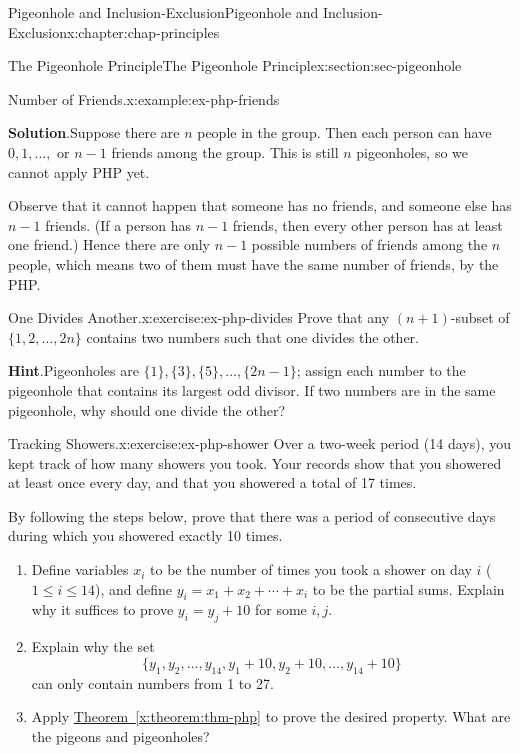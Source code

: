 \documentclass[oneside,10pt,]{book}
\newcommand{\blocktitlefont}{\relax}
\newcommand{\xreffont}{\relax}
\numberwithin{equation}{section}
\begin{document}
\begin{chapterptx}{Pigeonhole and Inclusion-Exclusion}{}{Pigeonhole and Inclusion-Exclusion}{}{}{x:chapter:chap-principles}
\begin{sectionptx}{The Pigeonhole Principle}{}{The Pigeonhole Principle}{}{}{x:section:sec-pigeonhole}
\begin{example}{Number of Friends.}{x:example:ex-php-friends}
\par\smallskip%
\noindent\textbf{\blocktitlefont Solution}.\hypertarget{g:solution:id437586}{}\quad{}Suppose there are \(n\) people in the group. Then each person can have \(0, 1, \ldots, \text{ or } n-1\) friends among the group. This is still \(n\) pigeonholes, so we cannot apply PHP yet.%
\par
Observe that it cannot happen that someone has no friends, and someone else has \(n-1\) friends. (If a person has \(n-1\) friends, then every other person has at least one friend.) Hence there are only \(n-1\) possible numbers of friends among the \(n\) people, which means two of them must have the same number of friends, by the PHP.%
\end{example}
\begin{inlineexercise}{One Divides Another.}{x:exercise:ex-php-divides}%
Prove that any \((n+1)\)-subset of \(\{1,2,\ldots,2n\}\) contains two numbers such that one divides the other.%
\par\smallskip%
\noindent\textbf{\blocktitlefont Hint}.\hypertarget{g:hint:id437880}{}\quad{}Pigeonholes are \(\{1\},\{3\},\{5\},\ldots,\{2n-1\}\); assign each number to the pigeonhole that contains its largest odd divisor. If two numbers are in the same pigeonhole, why should one divide the other?%
\end{inlineexercise}
\begin{inlineexercise}{Tracking Showers.}{x:exercise:ex-php-shower}%
Over a two-week period (14 days), you kept track of how many showers you took. Your records show that you showered at least once every day, and that you showered a total of 17 times.%
\par
By following the steps below, prove that there was a period of consecutive days during which you showered exactly 10 times.%
\begin{enumerate}[label=(\alph*)]
\item{}Define variables \(x_i\) to be the number of times you took a shower on day \(i\) (\(1 \leq i \leq 14\)), and define \(y_i = x_1 + x_2 + \cdots + x_i\) to be the partial sums. Explain why it suffices to prove \(y_i = y_j + 10\) for some \(i,j\).%
\item{}Explain why the set%
\begin{equation*}
\{y_1,y_2,\ldots,y_{14},y_1+10,y_2+10,\ldots,y_{14}+10\}
\end{equation*}
can only contain numbers from 1 to 27.%
\item{}Apply \hyperref[x:theorem:thm-php]{Theorem~{\xreffont\ref{x:theorem:thm-php}}} to prove the desired property. What are the pigeons and pigeonholes?%

\end{enumerate}
\end{inlineexercise}
\end{sectionptx}
\end{chapterptx}
\end{document}
